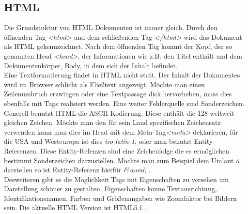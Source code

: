 \subsection{HTML}
Die Grundstuktur von \ac{HTML} Dokumenten ist immer gleich. Durch den öffnenden Tag \textit{<html>} und dem schließenden Tag \textit{</html>} wird das Dokument als \ac{HTML} gekennzeichnet. Nach dem öffnenden Tag kommt der Kopf, der so genannten Head \textit{<head>}, der Informationen wie z.B. den Titel enthält und dem Dokumentenkörper, Body, in dem sich der Inhalt befindet. \\
Eine Textformatierung findet in HTML nicht statt. Der Inhalt der Dokumentes wird im Browser schlicht als Fließtext angezeigt. Möchte man einen Zeilenumbruch erzwingen oder eine Textpassage dick hervorheben, muss dies ebenfalls mit Tags realisiert werden. Eine weiter Fehlerquelle sind Sonderzeichen. Generell benutzt HTML die \ac{ASCII} Kodierung. Diese enthält die 128 weltweit gleichen Zeichen. Möchte man den für sein Land spezifischen Zeichensatz verwenden kann man dies im Head mit dem Meta-Tag\textit{<meta>} deklarieren, für die USA und Westeuropa ist dies \textit{iso-latin-1}, oder man benutzt Entity-Referenzen. Diese Entity-Refenzen sind eine Zeichenfolge die es ermöglichen bestimmt Sonderzeichen darzustellen. Möchte man zum Beispiel dem Umlaut ä darstellen so ist Entity-Referenz hierfür \textit{\&\,auml;} . \\
Desweiteren gibt es die Möglichkeit Tags mit Eigenschaften zu versehen um Darstellung schöner zu gestalten. Eigenschaften könne Textausrichtung, Identifikationsnamen, Farben und Größenangaben wie Zoomfaktor bei Bildern sein. Die aktuelle HTML Version ist HTML5.1 .

